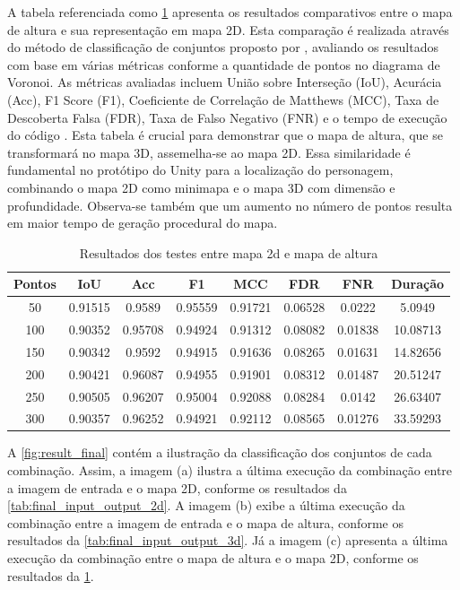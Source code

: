 A tabela referenciada como \cref{tab:final_output_2d_output_3d} apresenta os resultados comparativos entre o mapa de altura e sua representação em mapa 2D. Esta comparação é realizada através do método de classificação de conjuntos proposto por \cite{kirillov2019panoptic}, avaliando os resultados com base em várias métricas conforme a quantidade de pontos no diagrama de Voronoi. As métricas avaliadas incluem União sobre Interseção (IoU), Acurácia (Acc), F1 Score (F1), Coeficiente de Correlação de Matthews (MCC), Taxa de Descoberta Falsa (FDR), Taxa de Falso Negativo (FNR) e o tempo de execução do código \cite{Chicco2020, confusion_matrix_calculator, iou_metric_link}. Esta tabela é crucial para demonstrar que o mapa de altura, que se transformará no mapa 3D, assemelha-se ao mapa 2D. Essa similaridade é fundamental no protótipo do Unity para a localização do personagem, combinando o mapa 2D como minimapa e o mapa 3D com dimensão e profundidade. Observa-se também que um aumento no número de pontos resulta em maior tempo de geração procedural do mapa.


\begin{table}[h]
	\centering
	\caption{Resultados dos testes entre mapa 2d e mapa de altura}
	\label{tab:final_output_2d_output_3d}
	\begin{tabular}{|c|c|c|c|c|c|c|c|}
		\hline
						Pontos & IoU & Acc & F1 & MCC & FDR & FNR & Duração \\
		\hline
		50 & 0.91515 & 0.9589 & 0.95559 & 0.91721 & 0.06528 & 0.0222 & 5.0949\\
100 & 0.90352 & 0.95708 & 0.94924 & 0.91312 & 0.08082 & 0.01838 & 10.08713\\
150 & 0.90342 & 0.9592 & 0.94915 & 0.91636 & 0.08265 & 0.01631 & 14.82656\\
200 & 0.90421 & 0.96087 & 0.94955 & 0.91901 & 0.08312 & 0.01487 & 20.51247\\
250 & 0.90505 & 0.96207 & 0.95004 & 0.92088 & 0.08284 & 0.0142 & 26.63407\\
300 & 0.90357 & 0.96252 & 0.94921 & 0.92112 & 0.08565 & 0.01276 & 33.59293\\
		\hline
	\end{tabular}
\end{table}

A \cref{fig:result_final} contém a ilustração da classificação dos conjuntos de cada combinação. Assim, a imagem (a) ilustra a última execução da combinação entre a imagem de entrada e o mapa 2D, conforme os resultados da \cref{tab:final_input_output_2d}. A imagem (b) exibe a última execução da combinação entre a imagem de entrada e o mapa de altura, conforme os resultados da \cref{tab:final_input_output_3d}. Já a imagem (c) apresenta a última execução da combinação entre o mapa de altura e o mapa 2D, conforme os resultados da \cref{tab:final_output_2d_output_3d}.

